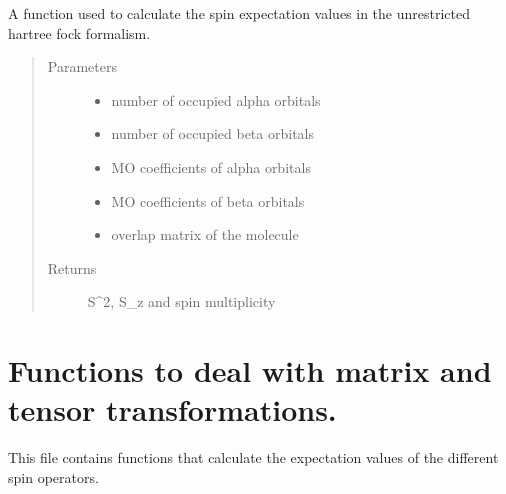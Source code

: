 \documentclass[letterpaper,10pt,english]{sphinxmanual}
\begin{document}
\begin{fulllineitems}
\label{\detokenize{spin:hf.utilities.spin.uhf}}
A function used to calculate the spin expectation values in the unrestricted hartree fock formalism.
\begin{quote}\begin{description}
\item[{Parameters}] \leavevmode\begin{itemize}
\item {} 
 \textendash{} number of occupied alpha orbitals

\item {} 
 \textendash{} number of occupied beta orbitals

\item {} 
 \textendash{} MO coefficients of alpha orbitals

\item {} 
 \textendash{} MO coefficients of beta orbitals

\item {} 
 \textendash{} overlap matrix of the molecule

\end{itemize}

\item[{Returns}] \leavevmode
S\textasciicircum{}2, S\_z and spin multiplicity

\end{description}\end{quote}

\end{fulllineitems}

\label{\detokenize{transform:module-hf.utilities.transform}}

\chapter{Functions to deal with matrix and tensor transformations.}
\label{\detokenize{transform:functions-to-deal-with-matrix-and-tensor-transformations}}\label{\detokenize{transform::doc}}
This file contains functions that calculate the expectation values of the different spin operators.
\end{document}
